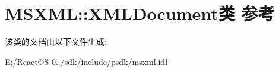 \hypertarget{class_m_s_x_m_l_1_1_x_m_l_document}{}\section{M\+S\+X\+ML\+:\+:X\+M\+L\+Document类 参考}
\label{class_m_s_x_m_l_1_1_x_m_l_document}


该类的文档由以下文件生成\+:\begin{DoxyCompactItemize}
\item 
E\+:/\+React\+O\+S-\/0../sdk/include/psdk/msxml.\+idl\end{DoxyCompactItemize}
